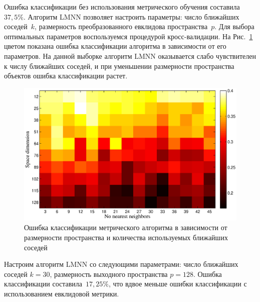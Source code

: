 	Ошибка классификации без использования метрического обучения составила~$37,5\%$.
	Алгоритм LMNN позволяет настроить параметры: число ближайших соседей~$k$,
	размерность преобразованного евклидова пространства~$p$.
	Для выбора оптимальных параметров воспользуемся процедурой кросс-валидации.
	На Рис.~\ref{ch5:fig:heat_map} цветом показана ошибка классификации алгоритма в зависимости от его параметров.
	На данной выборке алгоритм LMNN оказывается слабо чувствителен к числу ближайших соседей,
	и при уменьшении размерности пространства объектов ошибка классификации растет.
	\begin{figure}[!ht]
		\centering
		\includegraphics[width=1\linewidth]{figs/ch5/heat_map}
		\caption{Ошибка классификации метрического алгоритма в зависимости от размерности пространства и количества используемых ближайших соседей}
		\label{ch5:fig:heat_map}
	\end{figure}
	
	Настроим алгоритм LMNN со следующими параметрами: число ближайших соседей $k = 30$, размерность
	выходного пространства $p = 128$.
	Ошибка классификации составила~$17,25\%$, что вдвое меньше ошибки классификации с использованием евклидовой метрики.
	
